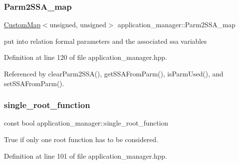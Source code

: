 \mbox{\label{classapplication__manager_a0e3aa4f0a01efa15c802541758b587c9}} 
\subsubsection{\texorpdfstring{Parm2\+S\+S\+A\+\_\+map}{Parm2SSA\_map}}
{\footnotesize\ttfamily \hyperlink{custom__map_8hpp_a18ca01763abbe3e5623223bfe5aaac6b}{Custom\+Map}$<$unsigned, unsigned$>$ application\+\_\+manager\+::\+Parm2\+S\+S\+A\+\_\+map\hspace{0.3cm}{\ttfamily [protected]}}



put into relation formal parameters and the associated ssa variables 



Definition at line 120 of file application\+\_\+manager.\+hpp.



Referenced by clear\+Parm2\+S\+S\+A(), get\+S\+S\+A\+From\+Parm(), is\+Parm\+Used(), and set\+S\+S\+A\+From\+Parm().

\mbox{\label{classapplication__manager_a02b25f02aeb5258b95c702142953e937}} 
\subsubsection{\texorpdfstring{single\+\_\+root\+\_\+function}{single\_root\_function}}
{\footnotesize\ttfamily const bool application\+\_\+manager\+::single\+\_\+root\+\_\+function\hspace{0.3cm}{\ttfamily [protected]}}



True if only one root function has to be considered. 



Definition at line 101 of file application\+\_\+manager.\+hpp.

\mbox{\label{classapplication__manager_aebaa10d554ec03bd1c3921116a07dbfe}} 

